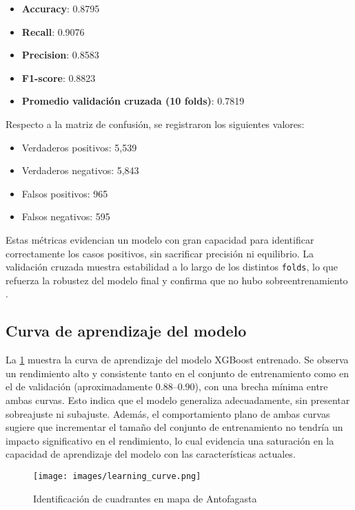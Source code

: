 \documentclass[12pt]{article}
\begin{document}
{\begin{itemize}
    \item \textbf{Accuracy}: 0.8795
    \item \textbf{Recall}: 0.9076
    \item \textbf{Precision}: 0.8583
    \item \textbf{F1-score}: 0.8823
    \item \textbf{Promedio validación cruzada (10 folds)}: 0.7819
\end{itemize}

\noindent Respecto a la matriz de confusión, se registraron los siguientes valores:

\begin{itemize}
    \item Verdaderos positivos: 5,539
    \item Verdaderos negativos: 5,843
    \item Falsos positivos: 965
    \item Falsos negativos: 595
\end{itemize}

Estas métricas evidencian un modelo con gran capacidad para identificar correctamente los casos positivos, sin sacrificar precisión ni equilibrio. La validación cruzada muestra estabilidad a lo largo de los distintos \texttt{folds}, lo que refuerza la robustez del modelo final y confirma que no hubo sobreentrenamiento \citep{geron2019hands}.

\subsection{Curva de aprendizaje del modelo}

La \cref{fig:learning_curve} muestra la curva de aprendizaje del modelo XGBoost entrenado. Se observa un rendimiento alto y consistente tanto en el conjunto de entrenamiento como en el de validación (aproximadamente 0.88–0.90), con una brecha mínima entre ambas curvas. Esto indica que el modelo generaliza adecuadamente, sin presentar sobreajuste ni subajuste. Además, el comportamiento plano de ambas curvas sugiere que incrementar el tamaño del conjunto de entrenamiento no tendría un impacto significativo en el rendimiento, lo cual evidencia una saturación en la capacidad de aprendizaje del modelo con las características actuales.


\begin{figure}[H]
    \centering
    \texttt{[image: images/learning\_curve.png]}
    \caption{Identificación de cuadrantes en mapa de Antofagasta}
    \label{fig:learning_curve}
\end{figure}

}
\end{document}
